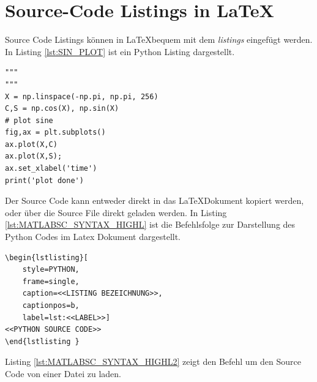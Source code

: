 \documentclass[TGAI_Laborbericht.tex]{subfiles}
\begin{document}
\section{Source-Code Listings in \LaTeX}
Source Code Listings können in \LaTeX bequem mit dem \textit{listings} eingefügt werden. In Listing \ref{lst:SIN_PLOT} ist ein Python Listing dargestellt.
\begin{lstlisting}[style=PYTHON, frame=single, caption=Sinus Plot, captionpos=b, label=lst:SIN_PLOT]
"""
"""
X = np.linspace(-np.pi, np.pi, 256)
C,S = np.cos(X), np.sin(X)
# plot sine
fig,ax = plt.subplots()
ax.plot(X,C)
ax.plot(X,S);
ax.set_xlabel('time')
print('plot done')
\end{lstlisting}
Der Source Code kann entweder direkt in das \LaTeX Dokument kopiert werden, oder über die Source File direkt geladen werden. In Listing \ref{lst:MATLABSC_SYNTAX_HIGHL} ist die Befehlsfolge zur Darstellung des Python Codes im Latex Dokument dargestellt. 
\begin{lstlisting}[style=LATEX, frame=single, caption=Latex Source Code Syntax Highlighting Prototyp, captionpos=b, label=lst:MATLABSC_SYNTAX_HIGHL]
\begin{lstlisting}[
	style=PYTHON,
	frame=single, 
	caption=<<LISTING BEZEICHNUNG>>, 
	captionpos=b, 
	label=lst:<<LABEL>>]
<<PYTHON SOURCE CODE>>
\end{lstlisting }
\end{lstlisting}
Listing \ref{lst:MATLABSC_SYNTAX_HIGHL2} zeigt den Befehl um den Source Code von einer Datei zu laden.
\begin{lstlisting}[style=LATEX, frame=single, caption=Source Code in Latex Dokument, captionpos=b, label=lst:MATLABSC_SYNTAX_HIGHL2]

\end{lstlisting}


%
%

\end{document}
